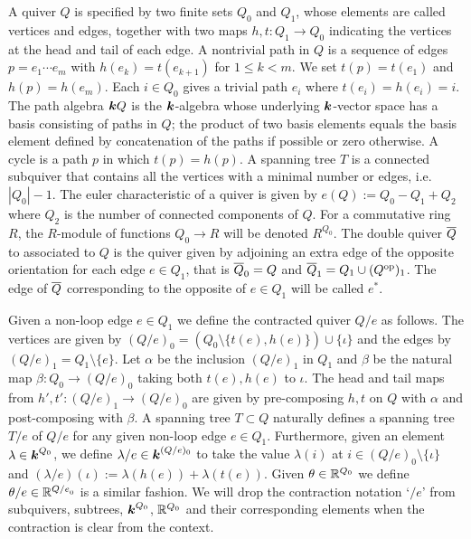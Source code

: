 \documentclass{amsart}
\theoremstyle{definition}
\begin{document}
A quiver $Q$ is specified by two finite sets $Q_0$ and $Q_1$, whose elements are called vertices and edges, together with two maps $h, t \colon Q_1 \rightarrow Q_0$ indicating the vertices at the head and tail of each edge.
A nontrivial path in $Q$ is a sequence of edges $p = e_1 \dotsb e_m$ with $h(e_{k}) = t(e_{k+1})$ for $1 \leq k < m$.  We set $t(p) = t(e_{1})$ and $h(p)= h(e_m)$.  
Each $i \in Q_0$ gives a trivial path $e_i$ where $t(e_i) = h(e_i) = i$.  
The path algebra ${\boldsymbol{k}} Q$ is the ${\boldsymbol{k}}$-algebra whose underlying ${\boldsymbol{k}}$-vector space has a basis consisting of paths in $Q$; the product of two basis elements equals the basis element defined by concatenation of the paths if possible or zero otherwise.  
A cycle is a path $p$ in which $t(p) = h(p)$. 
A spanning tree $T$ is a connected subquiver that contains all the vertices with a minimal number or edges, i.e. $|Q_0|-1$.
The euler characteristic of a quiver is given by $e(Q):= Q_0 - Q_1 +Q_2$ where $Q_2$ is the number of connected components of $Q$.
For a commutative ring $R$, the $R$-module of functions $Q_0 \rightarrow R$ will be denoted $R^{Q_0}$.
The double quiver ${\overline{Q}}$ to associated to $Q$ is the quiver given by adjoining an extra edge of the opposite orientation for each edge $e \in Q_1$, that is ${\overline{Q}}_0 = Q$ and ${\overline{Q}}_1= Q_1 \cup (Q^\text{op})_1$.
The edge of ${\overline{Q}}$ corresponding to the opposite of $e \in Q_1$ will be called $e^*$.

Given a non-loop edge $e \in Q_1$ we define the contracted quiver $Q/e$ as follows. The vertices are given by $(Q/e)_0 = (Q_0 \setminus \{t(e),h(e)\}) \cup \{\iota\}$ and the edges by $(Q/e)_1 = Q_1 \setminus \{e\}$. 
Let $\alpha$ be the inclusion $(Q/e)_1$ in $Q_1$ and $\beta$ be the natural map $\beta \colon Q_0 \rightarrow (Q/e)_0$ taking both $t(e),h(e)$ to $\iota$. 
The head and tail maps from $h',t' \colon (Q/e)_1 \rightarrow (Q/e)_0$ are given by pre-composing $h,t$ on $Q$ with $\alpha$ and post-composing with $\beta$.
A spanning tree $T \subset Q$ naturally defines a spanning tree $T/e$ of $Q/e$ for any given non-loop edge $e\in Q_1$.
Furthermore, given an element $\lambda \in {\boldsymbol{k}}^{Q_0}$, we define $\lambda/e \in {\boldsymbol{k}}^{(Q/e)_0}$ to take the value $\lambda(i)$ at $i \in (Q/e)_0 \setminus \{\iota\}$ and $(\lambda/e)(\iota):=\lambda(h(e))+\lambda(t(e))$.
Given $\theta \in \mathbb{R}^{Q_0}$ we define $\theta/e \in \mathbb{R}^{{Q/e}_0}$ is a similar fashion.
We will drop the contraction notation `$/e$' from subquivers, subtrees, ${\boldsymbol{k}}^{Q_0}$, $\mathbb{R}^{Q_0}$ and their corresponding elements when the contraction is clear from the context.
\end{document}
